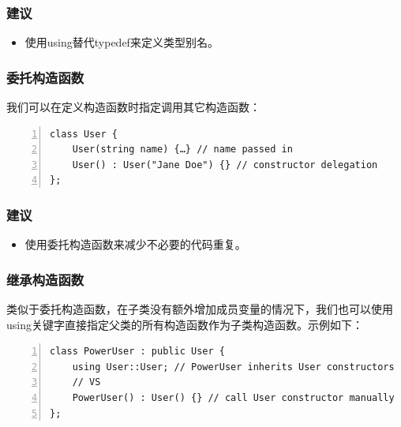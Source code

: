 \documentclass{ctexart}
\begin{document}
\subsubsection*{建议}

\begin{itemize}
	\item 使用using替代typedef来定义类型别名。
\end{itemize}

\subsubsection{委托构造函数}

我们可以在定义构造函数时指定调用其它构造函数：

\begin{lstlisting}[language={[ANSI]C},keywordstyle=\color{blue!70},commentstyle=\color{red!50!green!50!blue!50},frame=shadowbox, rulesepcolor=\color{red!20!green!20!blue!20},basicstyle=\small,numbers=left, numberstyle=\tiny,breaklines=true]
class User {
	User(string name) {…} // name passed in
	User() : User("Jane Doe") {} // constructor delegation
};
\end{lstlisting}

\subsubsection*{建议}

\begin{itemize}
	\item 使用委托构造函数来减少不必要的代码重复。
\end{itemize}

\subsubsection{继承构造函数}

类似于委托构造函数，在子类没有额外增加成员变量的情况下，我们也可以使用using关键字直接指定父类的所有构造函数作为子类构造函数。示例如下：

\begin{lstlisting}[language={[ANSI]C},keywordstyle=\color{blue!70},commentstyle=\color{red!50!green!50!blue!50},frame=shadowbox, rulesepcolor=\color{red!20!green!20!blue!20},basicstyle=\small,numbers=left, numberstyle=\tiny,breaklines=true]
class PowerUser : public User {  
	using User::User; // PowerUser inherits User constructors  
	// VS
	PowerUser() : User() {} // call User constructor manually
};
\end{lstlisting}
\end{document}

